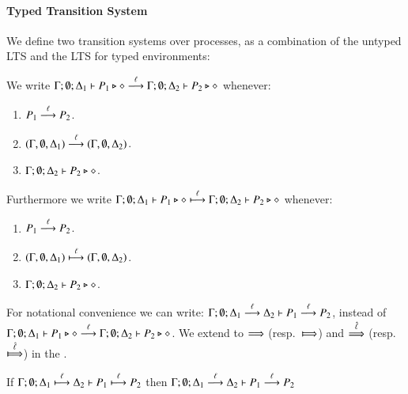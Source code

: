 \paragraph{Typed Transition System}

We define two transition systems over processes, as a combination
of the untyped LTS and the LTS for typed environments:

\begin{definition}\label{d:tlts}\rm
	We write
	$\Gamma; \emptyset; \Delta_1 \proves P_1 \hastype \Proc \by{\ell} \Gamma; \emptyset; \Delta_2 \proves P_2 \hastype \Proc$
	whenever:
%
	\begin{enumerate}
		\item	$P_1 \by{\ell} P_2$.
		\item	$(\Gamma, \emptyset, \Delta_1) \by{\ell} (\Gamma, \emptyset, \Delta_2)$.
		\item	$\Gamma; \emptyset; \Delta_2 \proves P_2 \hastype \Proc$.
	\end{enumerate}
%

	Furthermore we write
	$\Gamma; \emptyset; \Delta_1 \proves P_1 \hastype \Proc \hby{\ell} \Gamma; \emptyset; \Delta_2 \proves P_2 \hastype \Proc$
	whenever:
%
	\begin{enumerate}
		\item	$P_1 \by{\ell} P_2$.
		\item	$(\Gamma, \emptyset, \Delta_1) \hby{\ell} (\Gamma, \emptyset, \Delta_2)$.
		\item	$\Gamma; \emptyset; \Delta_2 \proves P_2 \hastype \Proc$.
	\end{enumerate}
%
\end{definition}

For notational convenience we can write:
$\horel{\Gamma}{\Delta_1}{P_1}{\by{\ell}}{\Delta_2}{P_2}$,
instead of $\Gamma; \emptyset; \Delta_1 \proves P_1 \hastype \Proc \by{\ell} \Gamma; \emptyset; \Delta_2 \proves P_2 \hastype \Proc$.
We extend to $\By{}$ (resp.\ $\Hby{}$) and $\By{\hat{\ell}}$ (resp.\ $\Hby{\hat{\ell}}$) in the .


\begin{lemma}[Invariant]\label{l:invariant}

			If $\horel{\Gamma}{\Delta_1}{P_1}{\hby{\ell}}{\Delta_2}{P_2}$
			then $\horel{\Gamma}{\Delta_1}{P_1}{\by{\ell}}{\Delta_2}{P_2}$
%
\end{lemma}

